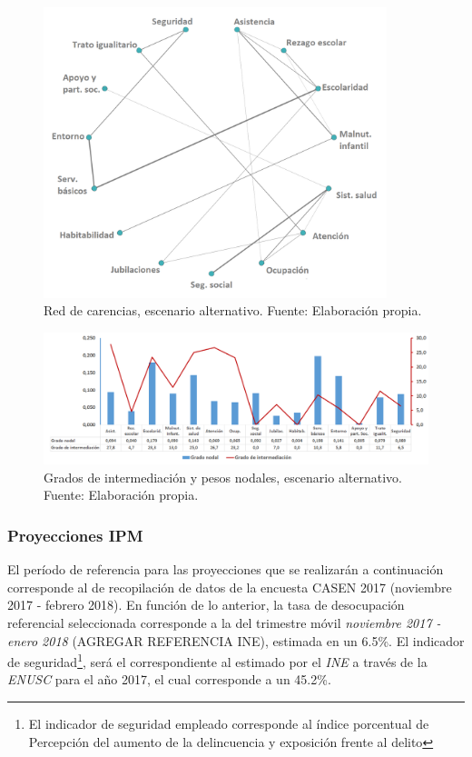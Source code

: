 \documentclass[12pt,letterpaper,spanish]{article}
\begin{document}
\begin{figure}[H]
  \centering
    \includegraphics[width=10cm]{Grafos/grafo_sensibilidad.png}
    \caption{Red de carencias, escenario alternativo. Fuente: Elaboración propia.}
    \label{Redsensible}
\end{figure}


\begin{figure}[H]
    \centering
    \includegraphics[width=\textwidth]{Grafos/nc_sensibilidad.png}
    \caption{Grados de intermediación y pesos nodales, escenario alternativo. Fuente: Elaboración propia.}
    \label{ncsensible}
\end{figure}





\subsubsection{Proyecciones IPM }

El período de referencia para las proyecciones que se realizarán a continuación corresponde al de recopilación de datos de la encuesta CASEN 2017 (noviembre 2017 - febrero 2018). En función de lo anterior, la tasa de desocupación referencial seleccionada corresponde a la del trimestre móvil \textit{noviembre 2017 - enero 2018} (AGREGAR REFERENCIA INE), estimada en un 6.5\%. El indicador de seguridad\footnote{El indicador de seguridad empleado corresponde al índice porcentual de Percepción del aumento de la delincuencia y exposición frente al delito}, será el correspondiente al estimado por el \textit{INE} a través de la \textit{ENUSC} para el año 2017, el cual corresponde a un 45.2\%. 
\end{document}
